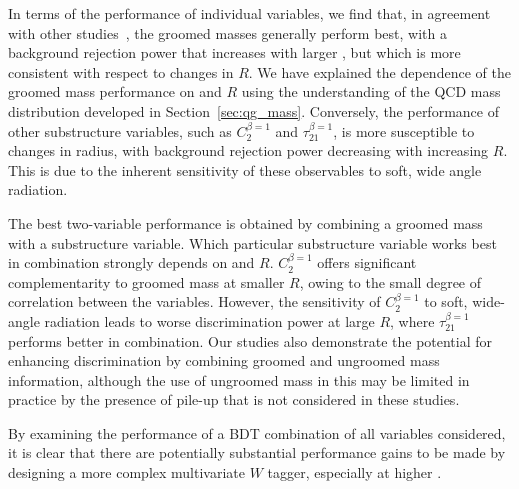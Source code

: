 In terms of the performance of individual variables, we find that, in
agreement with other studies~\cite{ATL-PHYS-PUB-2014-004}, the groomed masses generally perform best, 
with a background rejection
power that increases with larger \pt, but which is more consistent
with respect to changes in $R$. We have explained the dependence of the
groomed mass performance on \pt and $R$ using the understanding of the QCD mass distribution
developed in Section~\ref{sec:qg_mass}. Conversely, the performance of other
substructure variables, such as $C_2^{\beta=1}$ and
$\tau_{21}^{\beta=1}$, is more susceptible to changes in radius, with
background rejection power decreasing with increasing $R$. This is due
to the inherent sensitivity of these observables to soft, wide angle radiation.

The best two-variable performance is obtained by combining a groomed
mass with a substructure variable. Which particular substructure
variable works best in combination  strongly depends on \pT and
$R$. $C_2^{\beta=1}$ offers significant complementarity to groomed mass
at smaller $R$, owing to the small degree of correlation between the
variables. However, the sensitivity of $C_2^{\beta=1}$ to soft,
wide-angle radiation leads to worse discrimination power at large $R$,
where $\tau_{21}^{\beta=1}$ performs better in combination. Our
studies also demonstrate the potential for enhancing discrimination by
combining groomed and ungroomed mass information, although the use of
ungroomed mass in this may be limited in practice by the presence of
pile-up that is not considered in these studies.

By examining the performance of a BDT combination of all  variables
considered, it is clear that there are potentially substantial performance gains to be made by designing a more
complex multivariate $W$ tagger, especially at higher \pt.




